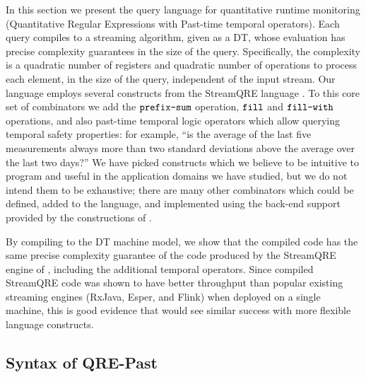 In this section we present the \QREpast{} query language for quantitative runtime monitoring (Quantitative Regular Expressions with Past-time temporal operators). Each query compiles to a streaming algorithm, given as a DT, whose evaluation has precise complexity guarantees in the size of the query. Specifically, the complexity is a quadratic number of registers and quadratic number of operations to process each element, in the size of the query, independent of the input stream. Our language employs several constructs from the StreamQRE language \cite{StreamQRE}. To this core set of combinators we add the $\texttt{prefix-sum}$ operation, $\texttt{fill}$ and $\texttt{fill-with}$ operations, and also past-time temporal logic operators which allow querying temporal safety properties: for example, ``is the average of the last five measurements always more than two standard deviations above the average over the last two days?''
We have picked constructs which we believe to be intuitive to program and useful in the application domains we have studied, but we do not intend them to be exhaustive; there are many other combinators which could be defined, added to the language, and implemented using the back-end support provided by the constructions of .

By compiling to the DT machine model, we show that the compiled code has the same precise complexity guarantee of the code produced by the StreamQRE engine of \cite{StreamQRE}, including the additional temporal operators. Since compiled StreamQRE code was shown to have better throughput than popular existing streaming engines (RxJava, Esper, and Flink) when deployed on a single machine, this is good evidence that \QREpast{} would see similar success with more flexible language constructs.

\subsection{Syntax of QRE-Past}
\label{dt:subsec:rm-syntax}

